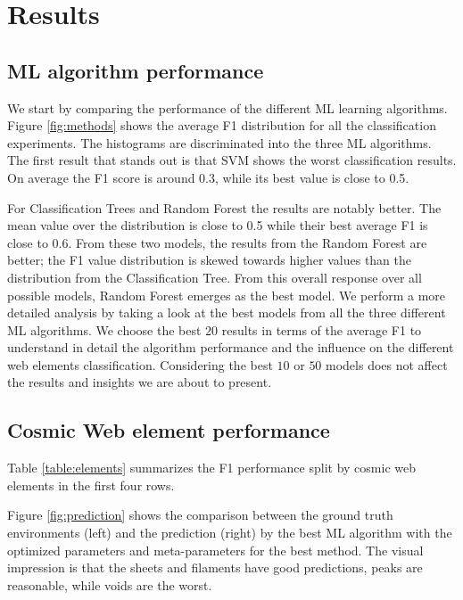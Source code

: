 \documentclass[usenatbib]{mnras}
\begin{document}
\section{Results}\label{sec:results}


\subsection{ML algorithm performance}
We start by comparing the performance of the different ML learning
algorithms.
Figure \ref{fig:methods} shows the average F1 distribution for
all the classification experiments. 
The histograms are discriminated into the three ML algorithms.
The first result that stands out is that SVM shows the worst
classification results.
On average the F1 score is around 0.3, while its best value is close
to 0.5.

For Classification Trees and Random Forest the results are notably better. 
The mean value over the distribution is close to 0.5 while their best
average F1 is close to 0.6.
From these two models, the results from the Random Forest are
better; the F1 value distribution is skewed towards higher values than
the distribution from the Classification Tree.
From this overall response over all possible models, Random Forest
emerges as the best model.
We perform a more detailed analysis by taking a look at the best
models from all the three different ML algorithms.
We choose the best $20$ results in terms of the average F1 to understand
in detail the algorithm performance and the influence on the 
different web elements classification.
Considering the best $10$ or $50$ models does not affect the results
and insights we are about to present.

\subsection{Cosmic Web element performance}

Table \ref{table:elements} summarizes the F1 performance split by cosmic
web elements in the first four rows.



Figure \ref{fig:prediction} shows the comparison between the ground
truth environments (left) and the prediction (right) by the best ML algorithm
with the optimized parameters and meta-parameters  for the best
method. 
The visual impression is that the sheets and filaments have good predictions,
peaks are reasonable, while voids are the worst. 
\end{document}
